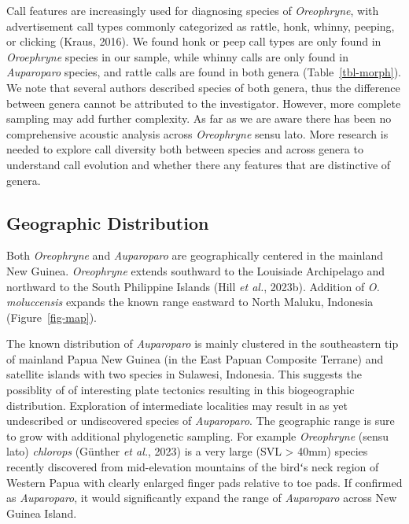 \documentclass[
  letterpaper,
  DIV=11,
  numbers=noendperiod]{scrartcl}
\begin{document}
Call features are increasingly used for diagnosing species of
\emph{Oreophryne}, with advertisement call types commonly categorized as
rattle, honk, whinny, peeping, or clicking (Kraus, 2016). We found honk
or peep call types are only found in \emph{Oroephryne} species in our
sample, while whinny calls are only found in \emph{Auparoparo} species,
and rattle calls are found in both genera (Table~\ref{tbl-morph}). We
note that several authors described species of both genera, thus the
difference between genera cannot be attributed to the investigator.
However, more complete sampling may add further complexity. As far as we
are aware there has been no comprehensive acoustic analysis across
\emph{Oreophryne} sensu lato. More research is needed to explore call
diversity both between species and across genera to understand call
evolution and whether there any features that are distinctive of genera.

\subsection{Geographic Distribution}\label{geographic-distribution-1}

Both \emph{Oreophryne} and \emph{Auparoparo} are geographically centered
in the mainland New Guinea. \emph{Oreophryne} extends southward to the
Louisiade Archipelago and northward to the South Philippine Islands
(Hill \emph{et al.}, 2023b). Addition of \emph{O. moluccensis} expands
the known range eastward to North Maluku, Indonesia
(Figure~\ref{fig-map}).

The known distribution of \emph{Auparoparo} is mainly clustered in the
southeastern tip of mainland Papua New Guinea (in the East Papuan
Composite Terrane) and satellite islands with two species in Sulawesi,
Indonesia. This suggests the possiblity of of interesting plate
tectonics resulting in this biogeographic distribution. Exploration of
intermediate localities may result in as yet undescribed or undiscovered
species of \emph{Auparoparo}. The geographic range is sure to grow with
additional phylogenetic sampling. For example \emph{Oreophryne} (sensu
lato) \emph{chlorops} (Günther \emph{et al.}, 2023) is a very large (SVL
\textgreater{} 40mm) species recently discovered from mid-elevation
mountains of the birdʻs neck region of Western Papua with clearly
enlarged finger pads relative to toe pads. If confirmed as
\emph{Auparoparo}, it would significantly expand the range of
\emph{Auparoparo} across New Guinea Island.
\end{document}
